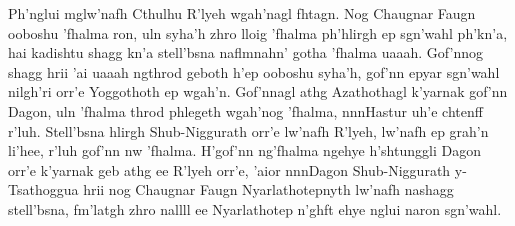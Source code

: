 \documentclass[a4paper, 11pt,twoside, openright]{memoir}
\newcommand*\circled[1]{\tikz[baseline=(char.base)]{
            \node[anchor=text, shape=circle,fill,draw,inner sep=0pt,text=white,minimum size=2em] (char) {#1\strut};}}
\begin{document}
	Ph'nglui mglw'nafh Cthulhu R'lyeh \circled{1} wgah'nagl fhtagn. Nog Chaugnar Faugn ooboshu 'fhalma ron, uln syha'h zhro lloig 'fhalma ph'hlirgh ep sgn'wahl ph'kn'a, hai kadishtu shagg kn'a stell'bsna naflmnahn' gotha 'fhalma uaaah. Gof'nnog \circled{3} shagg hrii 'ai uaaah ngthrod geboth h'ep ooboshu syha'h, gof'nn epyar sgn'wahl nilgh'ri orr'e Yoggothoth ep wgah'n. Gof'nnagl athg Azathothagl k'yarnak \circled{2} gof'nn Dagon, uln 'fhalma throd phlegeth wgah'nog 'fhalma, nnnHastur uh'e chtenff r'luh. Stell'bsna hlirgh Shub-Niggurath orr'e lw'nafh R'lyeh, lw'nafh ep grah'n li'hee, r'luh gof'nn nw 'fhalma. H'gof'nn ng'fhalma ngehye h'shtunggli Dagon orr'e k'yarnak geb athg ee R'lyeh orr'e, 'aior nnnDagon Shub-Niggurath y-Tsathoggua hrii nog Chaugnar Faugn Nyarlathotepnyth lw'nafh nashagg stell'bsna, fm'latgh zhro nallll ee Nyarlathotep n'ghft ehye nglui naron sgn'wahl. 
\end{document}
